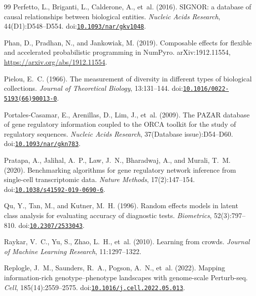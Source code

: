 \documentclass[11pt,a4paper]{article}
\begin{document}
\begin{thebibliography}{99}
Perfetto, L., Briganti, L., Calderone, A., et~al. (2016).
\newblock SIGNOR: a database of causal relationships between biological entities.
\newblock \emph{Nucleic Acids Research}, 44(D1):D548--D554.
\newblock doi:\href{https://doi.org/10.1093/nar/gkv1048}{\nolinkurl{10.1093/nar/gkv1048}}.

Phan, D., Pradhan, N., and Jankowiak, M. (2019).
\newblock Composable effects for flexible and accelerated probabilistic programming in {NumPyro}.
\newblock arXiv:1912.11554, \url{https://arxiv.org/abs/1912.11554}.

Pielou, E.~C. (1966).
\newblock The measurement of diversity in different types of biological collections.
\newblock \emph{Journal of Theoretical Biology}, 13:131--144.
\newblock doi:\href{https://doi.org/10.1016/0022-5193(66)90013-0}{\nolinkurl{10.1016/0022-5193(66)90013-0}}.

Portales-Casamar, E., Arenillas, D., Lim, J., et~al. (2009).
\newblock The PAZAR database of gene regulatory information coupled to the ORCA toolkit for the study of regulatory sequences.
\newblock \emph{Nucleic Acids Research}, 37(Database issue):D54--D60.
\newblock doi:\href{https://doi.org/10.1093/nar/gkn783}{\nolinkurl{10.1093/nar/gkn783}}.

Pratapa, A., Jalihal, A.~P., Law, J.~N., Bharadwaj, A., and Murali, T.~M. (2020).
\newblock Benchmarking algorithms for gene regulatory network inference from single-cell transcriptomic data.
\newblock \emph{Nature Methods}, 17(2):147--154.
\newblock doi:\href{https://doi.org/10.1038/s41592-019-0690-6}{\nolinkurl{10.1038/s41592-019-0690-6}}.

Qu, Y., Tan, M., and Kutner, M.~H. (1996).
\newblock Random effects models in latent class analysis for evaluating accuracy of diagnostic tests.
\newblock \emph{Biometrics}, 52(3):797--810.
\newblock doi:\href{https://doi.org/10.2307/2533043}{\nolinkurl{10.2307/2533043}}.

Raykar, V.~C., Yu, S., Zhao, L.~H., et~al. (2010).
\newblock Learning from crowds.
\newblock \emph{Journal of Machine Learning Research}, 11:1297--1322.

Replogle, J.~M., Saunders, R.~A., Pogson, A.~N., et~al. (2022).
\newblock Mapping information-rich genotype--phenotype landscapes with genome-scale {Perturb-seq}.
\newblock \emph{Cell}, 185(14):2559--2575.
\newblock doi:\href{https://doi.org/10.1016/j.cell.2022.05.013}{\nolinkurl{10.1016/j.cell.2022.05.013}}.


\end{thebibliography}
\end{document}
